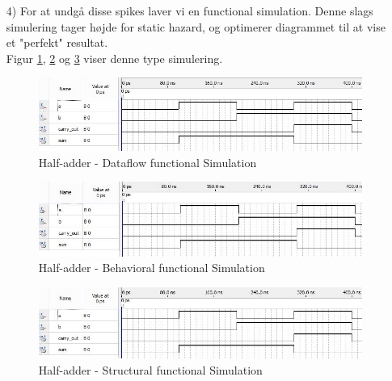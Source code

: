 \begin{enumerate}
	\item[4)] 
	For at undgå disse spikes laver vi en functional simulation. Denne slags simulering tager højde for static hazard, og optimerer diagrammet til at vise et "perfekt" resultat.\\
	Figur \ref{fig:HaDataflowFunctionalSim}, \ref{fig:HaBehavioralFunctionalSim} og \ref{fig:HaStructuralFunctionalSim} viser denne type simulering.\\
\begin{figure}[h]
	\includegraphics[scale=0.6]{pictures/Oevelse1/Half_adder/Dataflow_functional_simulation.jpg}
	\caption{Half-adder - Dataflow functional Simulation}
	\label{fig:HaDataflowFunctionalSim}
\end{figure}
\begin{figure}[h]
	\includegraphics[scale=0.6]{pictures/Oevelse1/Half_adder/Behavioral_functional_simulation.jpg}
	\caption{Half-adder - Behavioral functional Simulation}
	\label{fig:HaBehavioralFunctionalSim}
\end{figure}
\begin{figure}[h]
	\includegraphics[scale=0.6]{pictures/Oevelse1/Half_adder/Structural_functional_simulation.jpg}
	\caption{Half-adder - Structural functional Simulation}
	\label{fig:HaStructuralFunctionalSim}
\end{figure}
	\newpage
\end{enumerate}